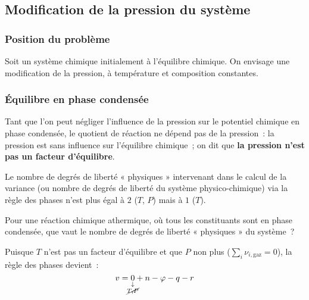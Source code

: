 \documentclass{article}
\newcommand{\gaz}{\text{gaz}}
\begin{document}
\subsection{Modification de la pression du système}
    \subsubsection{Position du problème}
    Soit un système chimique initialement à l’équilibre chimique. On envisage une modification de la pression, à température et composition constantes.
    \subsubsection{Équilibre en phase condensée}
    Tant que l’on peut négliger l’influence de la pression sur le potentiel chimique en phase condensée, le quotient de réaction ne dépend pas de la pression~: la pression est sans influence sur l’équilibre chimique~; on dit que \textbf{la pression n’est pas un facteur d’équilibre}.
    \begin{important}
        Le nombre de degrés de liberté « physiques »  intervenant dans le calcul de la variance (ou nombre de degrés de liberté du système physico-chimique) via la règle des phases n’est plus égal à $2$ ($T$, $P$) mais à $1$ ($T$).
    \end{important}
    \begin{remarque}[Question]
        Pour une réaction chimique athermique, où tous les constituants sont en phase condensée, que vaut le nombre de degrés de liberté « physiques » du système~?
    \end{remarque}
        Puisque $T$ n'est pas un facteur d'équilibre et que $P$ non plus ($\sum_i \nu_{i,\gaz} =0$), la règle des phases devient~:
        $$v=\underset{\mathclap{\substack{\downarrow\\ \cancel{T,P}}}}{0}+n-\varphi-q-r$$
        
\end{document}
